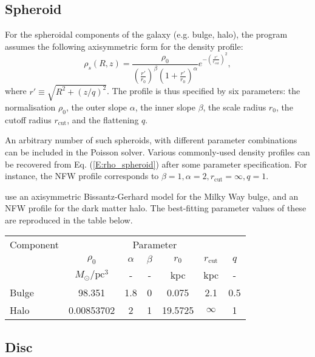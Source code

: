 \documentclass[11pt,a4paper]{article}
\begin{document}
\subsection{Spheroid}

For the spheroidal components of the galaxy (e.g. bulge, halo), the program assumes the following axisymmetric form for the density profile:
\begin{equation}
\label{E:rho_spheroid}
    \rho_s(R,z) = \frac{\rho_0}{\left(\frac{r'}{r_0}\right)^\beta\left(1+\frac{r'}{r_0}\right)^\alpha}e^{-\left(\frac{r'}{r_\mathrm{cut}}\right)^2},
\end{equation}
where $r' \equiv \sqrt{R^2 + (z/q)^2}$. The profile is thus specified by six parameters: the normalisation $\rho_0$, the outer slope $\alpha$, the inner slope $\beta$, the scale radius $r_0$, the cutoff radius $r_\mathrm{cut}$, and the flattening $q$.

An arbitrary number of such spheroids, with different parameter combinations can be included in the Poisson solver. Various commonly-used density profiles can be recovered from Eq. (\ref{E:rho_spheroid}) after some parameter specification. For instance, the NFW profile corresponds to $\beta=1, \alpha=2, r_\mathrm{cut}=\infty, q=1$.

\citet{McMillan2017} use an axisymmetric Bissantz-Gerhard model for the Milky Way bulge, and an NFW profile for the dark matter halo. The best-fitting parameter values of these are reproduced in the table below.

\begin{center}
    \begin{tabular}{l c c c c c c}\toprule[1.5pt]
    Component & \multicolumn{6}{c}{Parameter} \\
              & $\rho_0$                & $\alpha$ & $\beta$ & $r_0$   & $r_\mathrm{cut}$ & $q$ \\
              & $M_\odot/\mathrm{pc}^3$ & -        & -       & kpc     & kpc              & -   \\ \midrule[0.5pt]
    Bulge     & 98.351                  & 1.8      & 0       & 0.075   & 2.1              & 0.5 \\
    Halo      & 0.00853702              & 2        & 1       & 19.5725 & $\infty$         & 1   \\ \bottomrule[1.5pt]
    \end{tabular}
\end{center}

\subsection{Disc}
\end{document}
